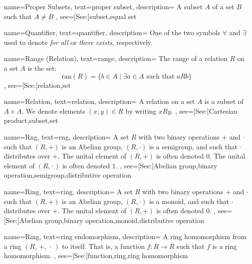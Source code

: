 {
    name={Proper Subsets},
    text={proper subset},
    description={
        A subset $A$ of a set $B$ such that $A\ne{B}$
    },
    see=[See:]{subset,equal set}
}

{
    name={Quantifier},
    text={quantifier},
    description={
        One of the two symbols $\forall$ and $\exists$ used to denote
        \textit{for all} or \textit{there exists}, respectively.
    }
}

{
    name={Range (Relation)},
    text={range},
    description={
        The range of a relation $R$ on a set $A$ is the set:
        \begin{equation*}
            \textrm{ran}(R)=\big\{b\in{A}\;|\;\exists{a}\in{A}
                \textrm{ such that }aRb\big\}
        \end{equation*}
    },
    see=[See:]{relation,set}
}

{
    name={Relation},
    text={relation},
    description={
        A relation on a set $A$ is a subset of $A\times{A}$. We denote elements
        $(x,y)\in{R}$ by writing $xRy$.
    },
    see=[See:]{Cartesian product,subset,set}
}

{
    name={Rng},
    text={rng},
    description={
        A set $R$ with two binary operations $+$ and $\cdot$ such
        that $(R,+)$ is an Abelian group, $(R,\cdot)$ is a semigroup,
        and such that $\cdot$ distributes over $+$.
        The unital element of $(R,+)$ is often denoted $0$. The unital element
        of $(R,\cdot\,)$ is often denoted $1$.
    },
    see=[See:]{Abelian group,binary operation,semigroup,distributive operation}
}

{
    name={Ring},
    text={ring},
    description={
        A set $R$ with two binary operations $+$ and $\cdot$ such
        that $(R,+)$ is an Abelian group, $(R,\cdot)$ is a monoid,
        and such that $\cdot$ distributes over $+$.
        The unital element of $(R,+)$ is often denoted $0$.
    },
    see=[See:]{Abelian group,binary operation,monoid,distributive operation}
}

{
    name={Ring},
    text={ring endomorphism},
    description={
        A ring homomorphism from a ring $(R,\,+,\,\cdot\,)$ to itself.
        That is, a function $f:R\rightarrow{R}$ such that $f$ is a
        ring homomorphism.
    },
    see=[See:]{function,ring,ring homomorphism}
}

